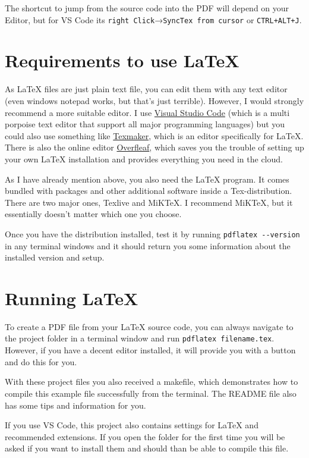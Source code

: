         The shortcut to jump from the source code into the PDF will depend on your Editor, but for VS Code its
        \verb|right Click|→\verb|SyncTex from cursor| or \verb|CTRL+ALT+J|.

    \section{Requirements to use LaTeX}
        As LaTeX files are just plain text file, you can edit them with any text editor (even windows notepad works, but that's just terrible).
        However, I would strongly recommend a more suitable editor. I use \href{https://code.visualstudio.com/}{Visual Studio Code} (which is a multi
        porpoise text editor that support all major programming languages) but you could also use something like
        \href{https://www.xm1math.net/texmaker/}{Texmaker}, which is an editor specifically for LaTeX. There is also the online editor
        \href{https://www.overleaf.com/}{Overfleaf}, which saves you the trouble of setting up your own LaTeX installation and provides everything you
        need in the cloud.

        \pagebreak\medskip
        As I have already mention above, you also need the LaTeX program. It comes bundled with packages and other additional software inside a
        Tex-distribution. There are two major ones, Texlive and MiKTeX. I recommend MiKTeX, but it essentially doesn't matter which one you choose.

        Once you have the distribution installed, test it by running \verb|pdflatex --version| in any terminal windows and it should return you
        some information about the installed version and setup.

    \section{Running LaTeX}
        To create a PDF file from your LaTeX source code, you can always navigate to the project folder in a terminal window and run
        \verb|pdflatex filename.tex|. However, if you have a decent editor installed, it will provide you with a button and do this for you.

        With these project files you also received a makefile, which demonstrates how to compile this example file successfully from the terminal. The
        README file also has some tips and information for you.

        If you use VS Code, this project also contains settings for LaTeX and recommended extensions. If you open the folder for the first time you
        will be asked if you want to install them and should than be able to compile this file.

